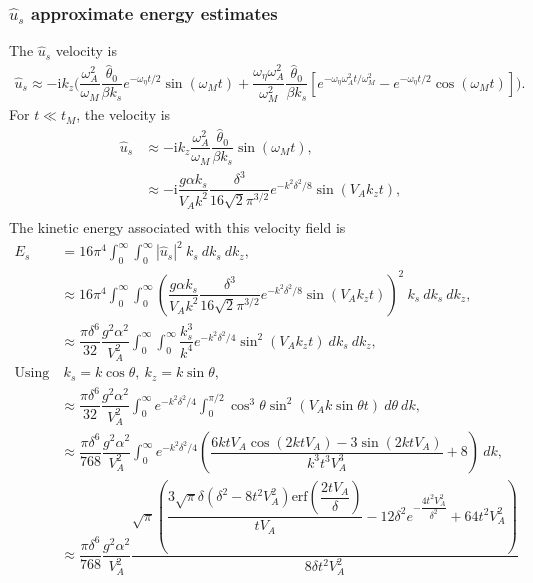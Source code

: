 \documentclass[12pt,psfig]{article}
\begin{document}
\subsubsection{$\hat{u}_s$ approximate energy estimates}
The $\hat{u}_s$ velocity is
\begin{align*}
\hat{u}_s\approx -\mathrm{i}k_z\Biggl(\dfrac{\omega_A^2}{\omega_M}\dfrac{\hat{\theta}_0}{\beta k_s}e^{-\omega_\eta t/2}\sin(\omega_M t)+\dfrac{\omega_\eta\omega_A^2}{\omega_M^2}\dfrac{\hat{\theta}_0}{\beta k_s}\left[e^{-\omega_\eta\omega_A^2t/\omega_M^2}-e^{-\omega_\eta t/2}\cos(\omega_M t)\right]\Biggr).
\end{align*}
For $t\ll t_M$, the velocity is
\begin{align*}
\hat{u}_s&\approx -\mathrm{i}k_z\dfrac{\omega_A^2}{\omega_M}\dfrac{\hat{\theta}_0}{\beta k_s} \sin(\omega_M t),\\
&\approx -\mathrm{i}\dfrac{g\alpha k_s}{V_A  k^2}\dfrac{\delta^3}{16\sqrt{2}\pi^{3/2}} e^{-k^2\delta^2/8}\sin(V_A k_z t),\\
\end{align*}
The kinetic energy associated with this velocity field is
\begin{align*}
E_s&=16\pi^4\int_{0}^{\infty}\int_{0}^{\infty}|\hat{u}_s|^2 \ k_s \ dk_s \ dk_z,\\
&\approx 16\pi^4\int_{0}^{\infty}\int_{0}^{\infty}\left(\dfrac{g\alpha k_s }{V_A  k^2}\dfrac{\delta^3}{16\sqrt{2}\pi^{3/2}}e^{-k^2\delta^2/8} \sin(V_A k_z t)\right)^2 \ k_s \ dk_s \ dk_z,\\
&\approx \dfrac{\pi \delta^6}{32}\dfrac{g^2\alpha^2}{V_A^2}\int_{0}^{\infty}\int_{0}^{\infty}\dfrac{ k_s^3 }{ k^4}e^{-k^2\delta^2/4} \sin^2(V_A k_z t)  \ dk_s \ dk_z,\\
\text{Using}& \ k_s=k\cos\theta, \ k_z=k\sin\theta, \\
&\approx \dfrac{\pi \delta^6}{32}\dfrac{g^2\alpha^2}{V_A^2}\int_{0}^{\infty}e^{-k^2\delta^2/4} \int_{0}^{\pi/2}\cos^3\theta  \sin^2(V_A k \sin\theta t) \ d\theta  \ dk ,\\
&\approx \dfrac{\pi \delta^6}{768}\dfrac{g^2\alpha^2}{V_A^2}\int_{0}^{\infty}e^{-k^2\delta^2/4}  \left(\dfrac{6 k t V_A \cos (2 k t V_A)-3 \sin (2 k t V_A)}{k^3 t^3 V_A^3}+8\right)  \ dk ,\\
&\approx \dfrac{\pi \delta^6}{768}\dfrac{g^2\alpha^2}{V_A^2} \dfrac{\sqrt{\pi } \left(\dfrac{3 \sqrt{\pi } \delta \left(\delta^2-8 t^2 V_A^2\right) \text{erf}\left(\dfrac{2 t V_A}{\delta}\right)}{t V_A}-12 \delta^2 e^{-\dfrac{4 t^2 V_A^2}{\delta^2}}+64 t^2 V_A^2\right)}{8 \delta t^2 V_A^2}
\end{align*}
\end{document}
